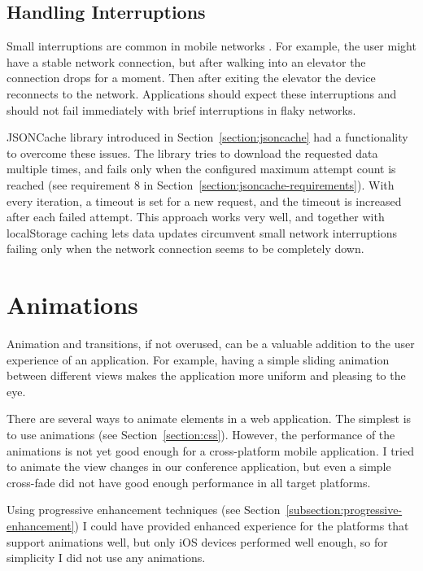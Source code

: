 \subsection{Handling Interruptions}

Small interruptions are common in mobile networks
\cite{zandy2002reliable}. For example, the user might have a stable
network connection, but after walking into an elevator the connection
drops for a moment. Then after exiting the elevator the device
reconnects to the network. Applications should expect these
interruptions and should not fail immediately with brief interruptions
in flaky networks.

JSONCache library introduced in Section~\ref{section:jsoncache} had a
functionality to overcome these issues. The library tries to download
the requested data multiple times, and fails only when the configured
maximum attempt count is reached (see requirement 8 in
Section~\ref{section:jsoncache-requirements}). With every iteration, a
timeout is set for a new request, and the timeout is increased after
each failed attempt. This approach works very well, and together with
localStorage caching lets data updates circumvent small network
interruptions failing only when the network connection seems to be
completely down.

\section{Animations}
\label{section:animations}

Animation and transitions, if not overused, can be a valuable addition
to the user experience of an application. For example, having a simple
sliding animation between different views makes the application more
uniform and pleasing to the eye.

There are several ways to animate elements in a web application. The
simplest is to use  animations (see
Section~\ref{section:css}). However, the performance of the animations
is not yet good enough for a cross-platform mobile application. I
tried to animate the view changes in our conference application, but
even a simple cross-fade did not have good enough performance in all
target platforms.

Using progressive enhancement techniques (see
Section~\ref{subsection:progressive-enhancement}) I could have
provided enhanced experience for the platforms that support animations
well, but only iOS devices performed well enough, so for simplicity I
did not use any animations.

